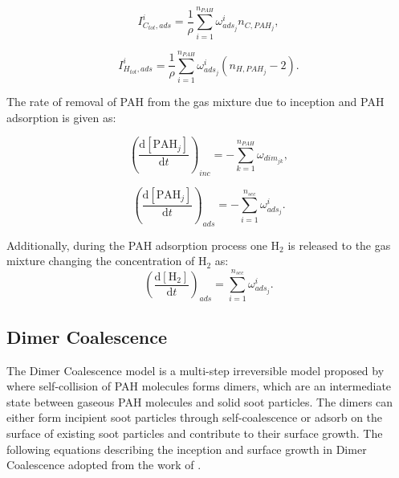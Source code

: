 \begin{equation}
	I^i_{C_{tot},ads} =
	\frac{1}{\rho}
	\sum_{i=1}^{n_{PAH}}
	\omega^i_{ads_j}
	n_{C,PAH_j}
	\label{eqn:ICtotads_reacdim},
\end{equation}

\begin{equation}
	I^i_{H_{tot},ads} =
	\frac{1}{\rho}
	\sum_{i=1}^{n_{PAH}}
	\omega^i_{ads_j}
	\left(n_{H,PAH_j}-2\right)
	\label{eqn:IHtotads_reacdim}.
\end{equation}

The rate of removal of PAH from the gas mixture due to inception and PAH adsorption is given as:

\begin{equation}
	\left(
	\frac{\mathrm{d}\left[{\mathrm{PAH}_j}\right]}{\mathrm{d}t}
	\right)_{inc}
	= 
	-\sum_{k=1}^{n_{PAH}}\omega_{dim_{jk}},
	\label{eqn:PAHscrub_inc_reacdim}
\end{equation}

\begin{equation}
	\left(
	\frac{\mathrm{d}\left[{\mathrm{PAH}_j}\right]}{\mathrm{d}t}
	\right)_{ads}
	= -\sum_{i=1}^{n_{sec}}\omega^i_{ads_j}.
	\label{eqn:PAHscrub_ads_reacdim}
\end{equation}

Additionally, during the PAH adsorption process one $\mathrm{H_2}$ is released to the gas mixture changing the concentration of $\mathrm{H_2}$ as:
\begin{equation}
	\left(
	\frac{\mathrm{d}\left[{\mathrm{H_2}}\right]}{\mathrm{d}t}
	\right)_{ads}
	= 
	\sum_{i=1}^{n_{sec}}\omega^i_{ads_j}
	\label{eqn:H2scrub_reacdim}.
\end{equation}

\subsection{Dimer Coalescence}
\label{sec:dimcoal}
The Dimer Coalescence model is a multi-step irreversible model proposed by \citet{blanquart2009joint} where self-collision of PAH molecules forms dimers, which are an intermediate state between gaseous PAH molecules and solid soot particles. The dimers can either form incipient soot particles through self-coalescence or adsorb on the surface of existing soot particles and contribute to their surface growth. The following equations describing the inception and surface growth in Dimer Coalescence adopted from the work of \citet{sun2021modelling}.


